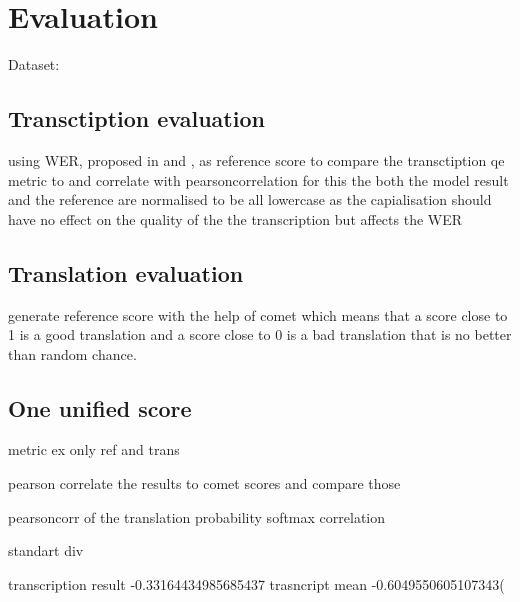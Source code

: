 
\chapter{Evaluation}
\label{ch:Evaluation}
Dataset: \cite{sperber2024evaluating}

\section{Transctiption evaluation}


using WER, proposed in \cite{woodard1982} and \cite{morris2004}, as reference score to compare the transctiption qe metric to and correlate with pearsoncorrelation \cite{2020SciPy-NMeth}
for this the both the model result and the reference are normalised to be all lowercase 
as the capialisation should have no effect on the quality of the the transcription but affects the WER

\section{Translation evaluation}

generate reference score with the help of comet \cite{rei-etal-2020-comet} which means that a score close to 1 is a good translation and a score close to 0 is a bad translation that is no better than random chance.

\section{One unified score}






metric ex only ref and trans 

pearson correlate \cite{2020SciPy-NMeth} the results to comet scores and compare those 

pearsoncorr of the translation probability
softmax correlation

 standart div

 transcription result
-0.33164434985685437
 trasncript mean
-0.6049550605107343(
